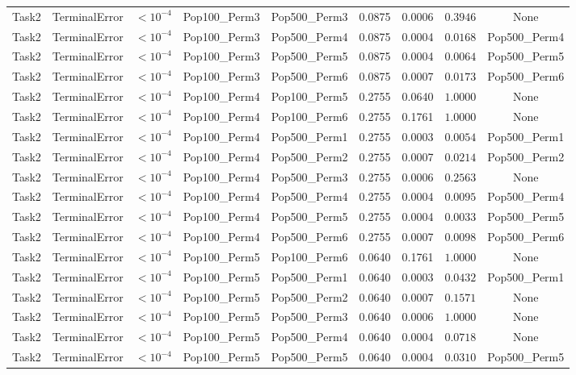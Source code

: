 \documentclass[8pt]{article}
\begin{document}
\begin{longtable}{llccccccc}
Task2 & TerminalError & $< 10^{-4}$ & Pop100\_Perm3 & Pop500\_Perm3 & 0.0875 & 0.0006 & $0.3946$ & None \\
Task2 & TerminalError & $< 10^{-4}$ & Pop100\_Perm3 & Pop500\_Perm4 & 0.0875 & 0.0004 & $0.0168$ & Pop500\_Perm4 \\
Task2 & TerminalError & $< 10^{-4}$ & Pop100\_Perm3 & Pop500\_Perm5 & 0.0875 & 0.0004 & $0.0064$ & Pop500\_Perm5 \\
Task2 & TerminalError & $< 10^{-4}$ & Pop100\_Perm3 & Pop500\_Perm6 & 0.0875 & 0.0007 & $0.0173$ & Pop500\_Perm6 \\
Task2 & TerminalError & $< 10^{-4}$ & Pop100\_Perm4 & Pop100\_Perm5 & 0.2755 & 0.0640 & $1.0000$ & None \\
Task2 & TerminalError & $< 10^{-4}$ & Pop100\_Perm4 & Pop100\_Perm6 & 0.2755 & 0.1761 & $1.0000$ & None \\
Task2 & TerminalError & $< 10^{-4}$ & Pop100\_Perm4 & Pop500\_Perm1 & 0.2755 & 0.0003 & $0.0054$ & Pop500\_Perm1 \\
Task2 & TerminalError & $< 10^{-4}$ & Pop100\_Perm4 & Pop500\_Perm2 & 0.2755 & 0.0007 & $0.0214$ & Pop500\_Perm2 \\
Task2 & TerminalError & $< 10^{-4}$ & Pop100\_Perm4 & Pop500\_Perm3 & 0.2755 & 0.0006 & $0.2563$ & None \\
Task2 & TerminalError & $< 10^{-4}$ & Pop100\_Perm4 & Pop500\_Perm4 & 0.2755 & 0.0004 & $0.0095$ & Pop500\_Perm4 \\
Task2 & TerminalError & $< 10^{-4}$ & Pop100\_Perm4 & Pop500\_Perm5 & 0.2755 & 0.0004 & $0.0033$ & Pop500\_Perm5 \\
Task2 & TerminalError & $< 10^{-4}$ & Pop100\_Perm4 & Pop500\_Perm6 & 0.2755 & 0.0007 & $0.0098$ & Pop500\_Perm6 \\
Task2 & TerminalError & $< 10^{-4}$ & Pop100\_Perm5 & Pop100\_Perm6 & 0.0640 & 0.1761 & $1.0000$ & None \\
Task2 & TerminalError & $< 10^{-4}$ & Pop100\_Perm5 & Pop500\_Perm1 & 0.0640 & 0.0003 & $0.0432$ & Pop500\_Perm1 \\
Task2 & TerminalError & $< 10^{-4}$ & Pop100\_Perm5 & Pop500\_Perm2 & 0.0640 & 0.0007 & $0.1571$ & None \\
Task2 & TerminalError & $< 10^{-4}$ & Pop100\_Perm5 & Pop500\_Perm3 & 0.0640 & 0.0006 & $1.0000$ & None \\
Task2 & TerminalError & $< 10^{-4}$ & Pop100\_Perm5 & Pop500\_Perm4 & 0.0640 & 0.0004 & $0.0718$ & None \\
Task2 & TerminalError & $< 10^{-4}$ & Pop100\_Perm5 & Pop500\_Perm5 & 0.0640 & 0.0004 & $0.0310$ & Pop500\_Perm5 \\

\end{longtable}
\end{document}
